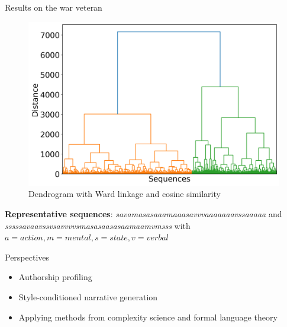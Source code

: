 \documentclass[10pt]{beamer}
\begin{document}
\begin{frame}{Results on the war veteran}

\begin{figure}
    \centering
    \includegraphics[width=0.65\linewidth]{img/dendogram_viet.png}
    \caption{Dendrogram with Ward linkage and cosine similarity}%
    \label{fig:dendogram}
\end{figure}

\vspace{0.25cm}
\pause

\textbf{Representative sequences}: \textit{savamasasaaamaaasavvvaaaaaaavssaaaaa} and \textit{sssssavaavssvsavvvvsmasasaasasaamaamvmsss} with $a=action, m=mental, s=state, v=verbal$


    
\end{frame}

\begin{frame}{Perspectives}

\begin{itemize}[<+->]
    \item Authorship profiling%
    \item Style-conditioned narrative generation%
    \item Applying methods from complexity science and formal language theory%
\end{itemize}

\end{frame}
\end{document}
